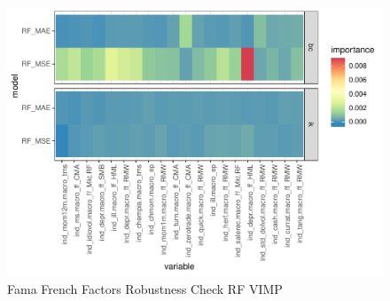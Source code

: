 \documentclass{article}
\begin{document}

\begin{figure}
	\includegraphics[]{../../Results/empirical_ff/empirical_vimp.pdf}
	\caption{Fama French Factors Robustness Check RF VIMP}
\end{figure}
\end{document}
